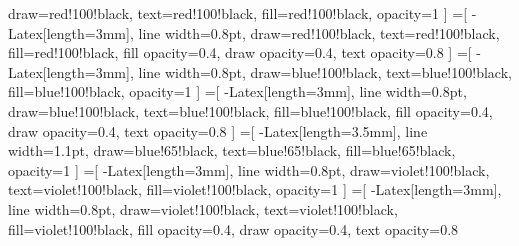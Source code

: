                     draw=red!100!black,
                    text=red!100!black,
                    fill=red!100!black,
                    opacity=1
                ]
                =[
                    -{Latex[length=3mm]},
                    line width=0.8pt,
                    draw=red!100!black,
                    text=red!100!black,
                    fill=red!100!black,
                    fill opacity=0.4,
                    draw opacity=0.4,
                    text opacity=0.8
                ]
                =[
                    -{Latex[length=3mm]},
                    line width=0.8pt,
                    draw=blue!100!black,
                    text=blue!100!black,
                    fill=blue!100!black,
                    opacity=1
                ]
                =[
                    -{Latex[length=3mm]},
                    line width=0.8pt,
                    draw=blue!100!black,
                    text=blue!100!black,
                    fill=blue!100!black,
                    fill opacity=0.4,
                    draw opacity=0.4,
                    text opacity=0.8
                ]
                =[
                    -{Latex[length=3.5mm]},
                    line width=1.1pt,
                    draw=blue!65!black,
                    text=blue!65!black,
                    fill=blue!65!black,
                    opacity=1
                ]
                =[
                    -{Latex[length=3mm]},
                    line width=0.8pt,
                    draw=violet!100!black,
                    text=violet!100!black,
                    fill=violet!100!black,
                    opacity=1
                ]
                =[
                    -{Latex[length=3mm]},
                    line width=0.8pt,
                    draw=violet!100!black,
                    text=violet!100!black,
                    fill=violet!100!black,
                    fill opacity=0.4,
                    draw opacity=0.4,
                    text opacity=0.8
